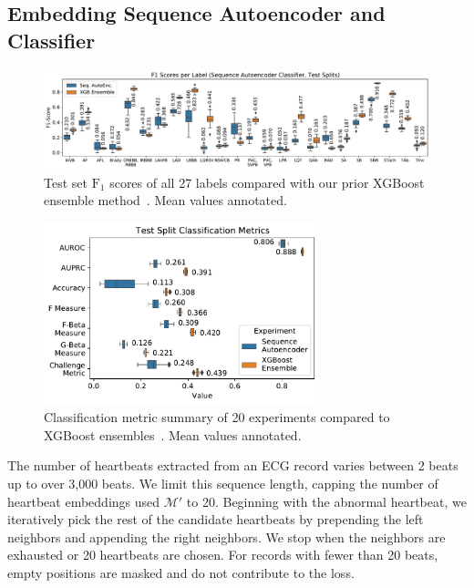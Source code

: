 \documentclass[\main/thesis.tex]{subfiles}
\begin{document}
\subsection{Embedding Sequence Autoencoder and Classifier}

\begin{figure}[b]
    \centering
    \includegraphics[trim={0.15cm 0.35cm 0.2cm 0.25cm},clip,width=\textwidth]{figure/aenc_label_f1s.pdf}
    \caption{Test set $\text{F}_1$ scores of all 27 labels compared with our prior XGBoost ensemble method~\cite{wong2020CINC-multilabel-ECG}. Mean values annotated.}
    \label{fig:label_f1s}
\end{figure}

\begin{figure}[b]
    \centering
    \includegraphics[trim={0.2cm 0.3cm 0.2cm 0.1cm},clip,width=8cm]{figure/aenc_classification_metrics.pdf}
    \caption{Classification metric summary of 20 experiments compared to XGBoost ensembles~\cite{wong2020CINC-multilabel-ECG}. Mean values annotated.}
    \label{fig:classification_metrics}
\end{figure}

The number of heartbeats extracted from an ECG record varies between 2 beats up to over 3,000 beats.
We limit this sequence length, capping the number of heartbeat embeddings used $\mathcal{M'}$ to 20.
Beginning with the abnormal heartbeat, we iteratively pick the rest of the candidate heartbeats by prepending the left neighbors and appending the right neighbors.
We stop when the neighbors are exhausted or 20 heartbeats are chosen.
For records with fewer than 20 beats, empty positions are masked and do not contribute to the loss.
\end{document}
